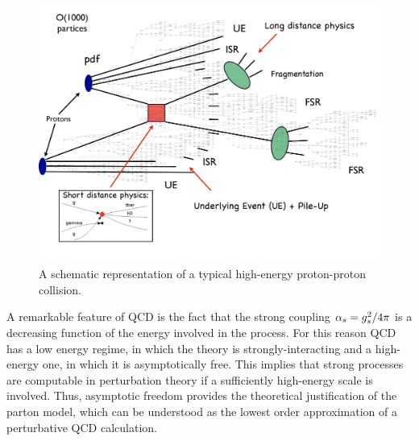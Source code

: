 \begin{figure}
\begin{center}
\includegraphics[scale=.4]{figures/tth}
\caption{A schematic representation of a typical high-energy proton-proton collision.}
\label{fig:tth_event}
\end{center}
\end{figure}



A remarkable feature of QCD is the fact that the strong coupling $\alpha_s= g_s^2/4 \pi$ is a decreasing function
of the energy involved in the process.
For this reason QCD has a
low energy regime, in which the theory is strongly-interacting and
a high-energy one, in which it is asymptotically free. This implies
that strong processes are computable in perturbation theory
if a sufficiently high-energy scale is involved. 
%
Thus, asymptotic freedom provides the theoretical justification of the parton model, which can be understood as the lowest
order approximation of a perturbative QCD calculation.


